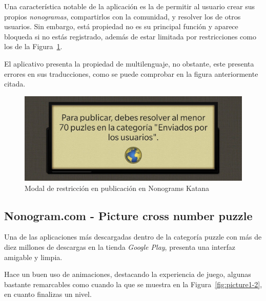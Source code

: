  Una característica notable de la aplicación es la de permitir al usuario crear sus propios \textit{nonogramas}, compartirlos con la comunidad, y resolver los de
 otros usuarios. Sin embargo, está propiedad no es su principal función y aparece bloqueda si no estás registrado, además de estar limitada por restricciones como los de la 
 Figura~\ref{fig:katana3}.

 El aplicativo presenta la propiedad de multilenguaje, no obstante, este presenta errores en sus traducciones, como se puede comprobar en la figura anteriormente
 citada.

 \begin{figure}[H]
   \centering
   \includegraphics[scale=.175]{images/nonokatana4.jpg}
   \caption{Modal de restricción en publicación en Nonograms Katana}
   \label{fig:katana3}
 \end{figure}
 

\subsection{Nonogram.com - Picture cross number puzzle}

Una de las aplicaciones más descargadas dentro de la categoría puzzle con más de diez millones de descargas en la tienda \textit{Google Play}, 
presenta una interfaz amigable y limpia.

Hace un buen uso de animaciones, destacando la experiencia de juego, algunas bastante remarcables como cuando la que se muestra en la 
Figura~\ref{fig:picture1-2}, en cuanto finalizas un nivel.

